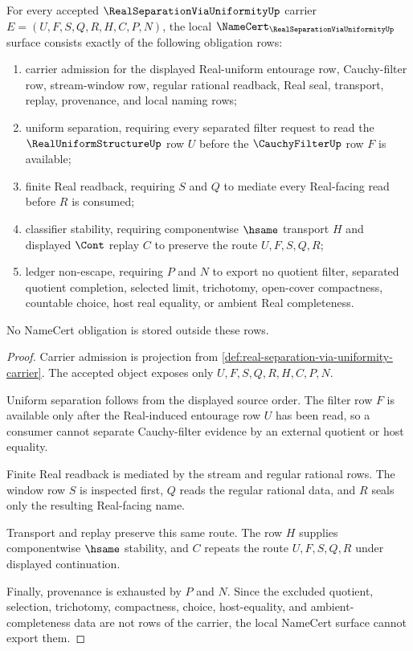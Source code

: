 \begin{theorem}
\label{thm:real-separation-via-uniformity-namecert-obligations}
For every accepted $\RealSeparationViaUniformityUp$ carrier $E=(U,F,S,Q,R,H,C,P,N)$, the local $\NameCert_{\RealSeparationViaUniformityUp}$ surface consists exactly of the following obligation rows:
\begin{enumerate}
\item carrier admission for the displayed Real-uniform entourage row, Cauchy-filter row, stream-window row, regular rational readback, Real seal, transport, replay, provenance, and local naming rows;
\item uniform separation, requiring every separated filter request to read the $\RealUniformStructureUp$ row $U$ before the $\CauchyFilterUp$ row $F$ is available;
\item finite Real readback, requiring $S$ and $Q$ to mediate every Real-facing read before $R$ is consumed;
\item classifier stability, requiring componentwise $\hsame$ transport $H$ and displayed $\Cont$ replay $C$ to preserve the route $U,F,S,Q,R$;
\item ledger non-escape, requiring $P$ and $N$ to export no quotient filter, separated quotient completion, selected limit, trichotomy, open-cover compactness, countable choice, host real equality, or ambient Real completeness.
\end{enumerate}
No NameCert obligation is stored outside these rows.
\end{theorem}
\begin{proof}
Carrier admission is projection from \autoref{def:real-separation-via-uniformity-carrier}. The accepted object exposes only $U,F,S,Q,R,H,C,P,N$.

Uniform separation follows from the displayed source order. The filter row $F$ is available only after the Real-induced entourage row $U$ has been read, so a consumer cannot separate Cauchy-filter evidence by an external quotient or host equality.

Finite Real readback is mediated by the stream and regular rational rows. The window row $S$ is inspected first, $Q$ reads the regular rational data, and $R$ seals only the resulting Real-facing name.

Transport and replay preserve this same route. The row $H$ supplies componentwise $\hsame$ stability, and $C$ repeats the route $U,F,S,Q,R$ under displayed continuation.

Finally, provenance is exhausted by $P$ and $N$. Since the excluded quotient, selection, trichotomy, compactness, choice, host-equality, and ambient-completeness data are not rows of the carrier, the local NameCert surface cannot export them.
\end{proof}

